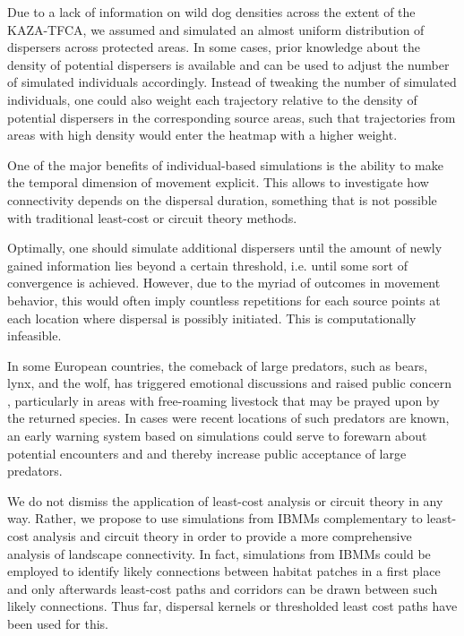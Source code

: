 \documentclass[abstract=on,10pt,a4paper,bibliography=totocnumbered]{article}
\begin{document}
Due to a lack of information on wild dog densities across the extent of the
KAZA-TFCA, we assumed and simulated an almost uniform distribution of dispersers
across protected areas. In some cases, prior knowledge about the density of
potential dispersers is available and can be used to adjust the number of
simulated individuals accordingly. Instead of tweaking the number of simulated
individuals, one could also weight each trajectory relative to the density of
potential dispersers in the corresponding source areas, such that trajectories
from areas with high density would enter the heatmap with a higher weight.

One of the major benefits of individual-based simulations is the ability to make
the temporal dimension of movement explicit. This allows to investigate how
connectivity depends on the dispersal duration, something that is not possible
with traditional least-cost or circuit theory methods.

Optimally, one should simulate additional dispersers until the amount of newly
gained information lies beyond a certain threshold, i.e. until some sort of
convergence is achieved. However, due to the myriad of outcomes in movement
behavior, this would often imply countless repetitions for each source points at
each location where dispersal is possibly initiated. This is computationally
infeasible.

In some European countries, the comeback of large predators, such as bears,
lynx, and the wolf, has triggered emotional discussions and raised public
concern \citep{Behr.2017}, particularly in areas with free-roaming livestock
that may be prayed upon by the returned species. In cases were recent locations
of such predators are known, an early warning system based on simulations could
serve to forewarn about potential encounters and and thereby increase public
acceptance of large predators.

We do not dismiss the application of least-cost analysis or circuit theory in
any way. Rather, we propose to use simulations from IBMMs complementary to
least-cost analysis and circuit theory in order to provide a more comprehensive
analysis of landscape connectivity. In fact, simulations from IBMMs could be
employed to identify likely connections between habitat patches in a first place
and only afterwards least-cost paths and corridors can be drawn between such
likely connections. Thus far, dispersal kernels or thresholded least cost paths
have been used for this.
\end{document}
